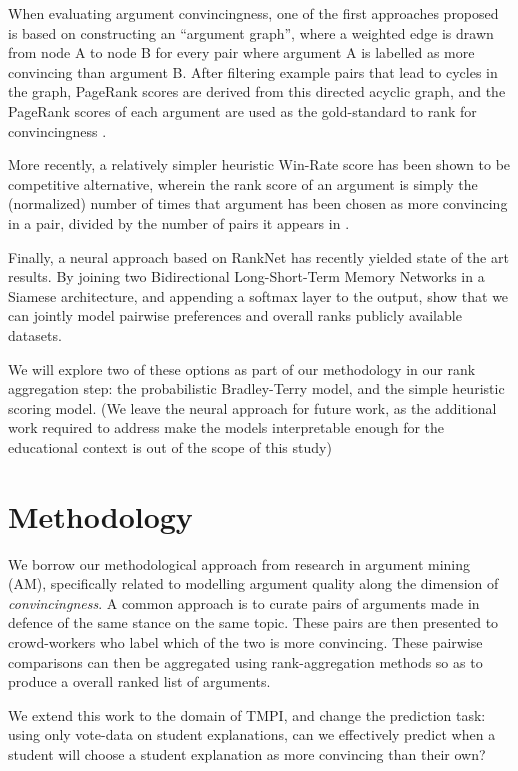 \documentclass[sigconf]{acmart}
\begin{document}
When evaluating argument convincingness, one of the first approaches proposed 
is based on constructing an ``argument graph'', where a weighted edge is drawn 
from node A to node B for every pair where argument A is labelled as more 
convincing than argument B. 
After filtering example pairs that lead to cycles in the graph, PageRank scores 
are derived from this directed acyclic graph, and the PageRank 
scores of each argument are used as the gold-standard to rank for 
convincingness \cite{habernal_which_2016}.

More recently, a relatively simpler heuristic Win-Rate score has been shown to 
be competitive alternative, wherein the rank score of an argument is simply the 
(normalized) number of times that argument has been chosen as more convincing 
in a pair, divided by the number of pairs it appears in
\cite{potash_ranking_2019}.

Finally, a neural approach based on RankNet has recently yielded state of the 
art results. By joining two Bidirectional Long-Short-Term Memory Networks in a 
Siamese architecture, and appending a softmax layer to the output, 
\cite{gleize_are_2019} show that we can jointly model pairwise preferences and 
overall ranks publicly available datasets.

We will explore two of these options as part of our methodology in our rank 
aggregation step: the probabilistic Bradley-Terry model, and the simple 
heuristic scoring model. 
(We leave the neural approach for future work, as the additional work required 
to address make the models interpretable enough for the educational context is 
out of the scope of this study)


\section{Methodology}

We borrow our methodological approach from research in argument mining (AM), 
specifically related to modelling argument quality along the 
dimension of \textit{convincingness}.
A common approach is to curate pairs of arguments made in defence of the same 
stance on the same topic.
These pairs are then presented to crowd-workers who label which of the two is 
more convincing. 
These pairwise comparisons can then be aggregated using rank-aggregation 
methods so as to produce a overall ranked list of arguments.

We extend this work to the domain of TMPI, and change the prediction task: 
using only vote-data on student explanations, can we effectively predict when a 
student will choose a student explanation as more convincing than their own?
\end{document}
